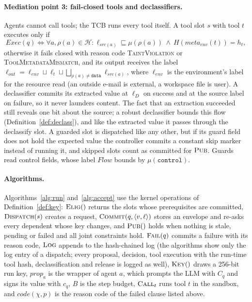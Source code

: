 \documentclass[pdflatex,sn-mathphys-num]{sn-jnl}
\theoremstyle{thmstyleone}%
\theoremstyle{thmstyletwo}%
\theoremstyle{thmstylethree}%
\begin{document}
\paragraph{Mediation point 3: fail-closed tools and declassifiers.} Agents cannot call tools; the TCB runs every tool itself. A tool slot $s$ with tool $t$ executes only if
\[ \mathit{Exec}(q) \iff \forall a, \rho(a) \in \mathcal{H}\colon \ell_{\mathit{src}(a)} \sqsubseteq \mu(\rho(a)) \ \land\ H(\mathit{meta}_{\mathit{env}}(t)) = h_t , \]
otherwise it fails closed with reason code \textsc{TaintViolation} or \textsc{ToolMetadataMismatch}, and its output receives the label $\ell_{\mathit{out}} = \ell_{\mathit{env}} \sqcup \ell_t \sqcup \bigsqcup_{\rho(a) \neq \texttt{data}} \ell_{\mathit{src}(a)}$, where $\ell_{\mathit{env}}$ is the environment's label for the resource read (an outside e-mail is external, a workspace file is user). A declassifier commits its extracted value at $\ell_D$ on success and at the source label on failure, so it never launders content. The fact that an extraction succeeded still reveals one bit about the source; a robust declassifier bounds this flow (Definition~\ref{def:declass}), and like the extracted value it passes through the declassify slot. A guarded slot is dispatched like any other, but if its guard field does not hold the expected value the controller commits a constant skip marker instead of running it, and skipped slots count as committed for $\textsc{Pub}$. Guards read control fields, whose label $\mathit{Flow}$ bounds by $\mu(\texttt{control})$.

\paragraph{Algorithms.} Algorithms~\ref{alg:run} and~\ref{alg:accept} use the kernel operations of Definition~\ref{def:key}: $\textsc{Elig}()$ returns the slots whose prerequisites are committed, $\textsc{Dispatch}(s)$ creates a request, $\textsc{Commit}(q, \langle v, \ell \rangle)$ stores an envelope and re-asks every dependent whose key changes, and $\textsc{Pub}()$ holds when nothing is stale, pending or failed and all joint constraints hold. $\textsc{Fail}(q)$ commits a failure with its reason code, $\textsc{Log}$ appends to the hash-chained log (the algorithms show only the log entry of a dispatch; every proposal, decision, tool execution with the run-time tool hash, declassification and release is logged as well), $\textsc{Key}()$ draws a 256-bit run key, $\mathit{prop}_a$ is the wrapper of agent $a$, which prompts the LLM with $C_q$ and signs its value with $c_q$, $B$ is the step budget, $\textsc{Call}_t$ runs tool $t$ in the sandbox, and $\mathit{code}(\chi, p)$ is the reason code of the failed clause listed above.
\end{document}
